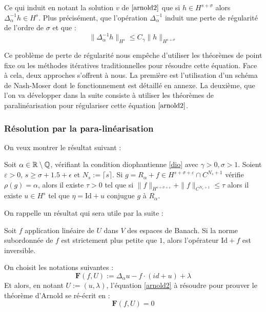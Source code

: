 \documentclass[11pt,a4paper]{article}
\begin{document}
Ce qui induit en notant la solution $v$ de $\eqref{arnold2}$ que si $h \in H^{s+\sigma}$ alors $\Delta_\alpha^{-1}h \in H^{s}$. Plus précisément, que l'opération $\Delta_{\alpha}^{-1}$ induit une perte de régularité de l'ordre de $\sigma$ et que :
\begin{equation}\label{dio}
\|\Delta_\alpha^{-1}h\|_{H^s} \leq C_\gamma \|h\|_{H^{s+\sigma}}
\end{equation}
\par
Ce problème de perte de régularité nous empêche d'utiliser les théorèmes de point fixe ou les méthodes itératives traditionnelles pour résoudre cette équation. Face à cela, deux approches s'offrent à nous. La première est l'utilisation d'un schéma de Nash-Moser dont le fonctionnement est détaillé en annexe. La deuxième, que l'on va développer dans la suite consiste à utiliser les théorèmes de paralinéarisation pour régulariser cette équation $\eqref{arnold2}$.
\subsubsection{Résolution par la para-linéarisation}
On veux montrer le résultat suivant :
\begin{thm}[Arnold]\label{arnold}
Soit $\alpha \in \mathbb R\setminus \mathbb Q$, vérifiant la condition diophantienne \eqref{dio} avec $\gamma > 0, \sigma > 1$. Soient $\varepsilon >0$, $s\geq \sigma + 1.5 + \epsilon$ et $N_s := \lceil s \rceil$. Si $g=R_\alpha + f \in H^{s+\sigma + \varepsilon}\cap C^{N_s+1}$ vérifie $\rho(g)=\alpha$, alors il existe $\tau > 0$ tel que si $\|f\|_{H^{s+\sigma + \varepsilon}} + \|f\|_ {C^{N_s+1}} \leq \tau$ alors il existe $u \in H^s$ tel que $\eta = \text{Id} + u$ conjugue $g$ à $R_\alpha$.
\end{thm}

On rappelle un résultat qui sera utile par la suite :
\begin{lemma}
Soit $f$ application linéaire de $U$ dans $V$ des espaces de Banach. Si la norme subordonnée de $f$ est strictement plus petite que $1$, alors l'opérateur $\text{Id} + f$ est inversible.
\end{lemma}

On choisit les notations suivantes :
\begin{equation*}
\mathbf{F}(f,U) :=\Delta_\alpha u - f \cdot (id +u) + \lambda
\end{equation*}
Et alors, en notant $U:=(u,\lambda)$, l'équation \eqref{arnold2} à résoudre pour prouver le théorème d'Arnold se ré-écrit en :
\begin{equation}\label{equ_reso}
\mathbf{F}(f,U)=0
\end{equation} 
\end{document}
